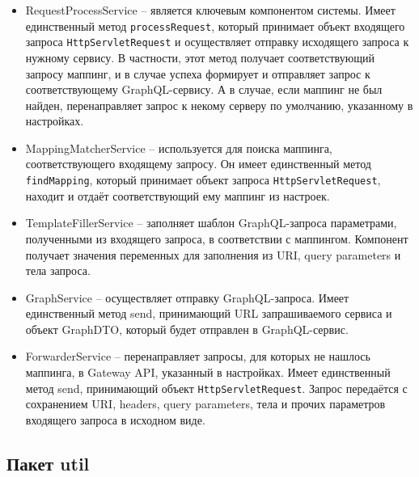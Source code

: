 \begin{itemize}
	\item RequestProcessService -- является ключевым компонентом системы.
	Имеет единственный метод \texttt{processRequest}, который принимает объект входящего запроса \texttt{HttpServletRequest} и осуществляет отправку исходящего запроса к нужному сервису.
	В частности, этот метод получает соответствующий запросу маппинг, и в случае успеха формирует и отправляет запрос к соответствующему GraphQL-сервису.
	А в случае, если маппинг не был найден, перенаправляет запрос к некому серверу по умолчанию, указанному в настройках.

	\item MappingMatcherService -- используется для поиска маппинга, соответствующего входящему запросу.
	Он имеет единственный метод \texttt{findMapping}, который принимает объект запроса \texttt{HttpServletRequest}, находит и отдаёт соответствующий ему маппинг из настроек.

	\item TemplateFillerService – заполняет шаблон GraphQL-запроса параметрами, полученными из входящего запроса, в соответствии с маппингом.
	Компонент получает значения переменных для заполнения из URI, query parameters и тела запроса.

	\item GraphService – осуществляет отправку GraphQL-запроса.
	Имеет единственный метод send, принимающий URL запрашиваемого сервиса и объект GraphDTO, который будет отправлен в GraphQL-сервис.

	\item ForwarderService – перенаправляет запросы, для которых не нашлось маппинга, в Gateway API, указанный в настройках.
	Имеет единственный метод send, принимающий объект \texttt{HttpServletRequest}.
	Запрос передаётся с сохранением URI, headers, query parameters, тела и прочих параметров входящего запроса в исходном виде.

\end{itemize}



\subsection{Пакет util}\label{subsec:package-util}

